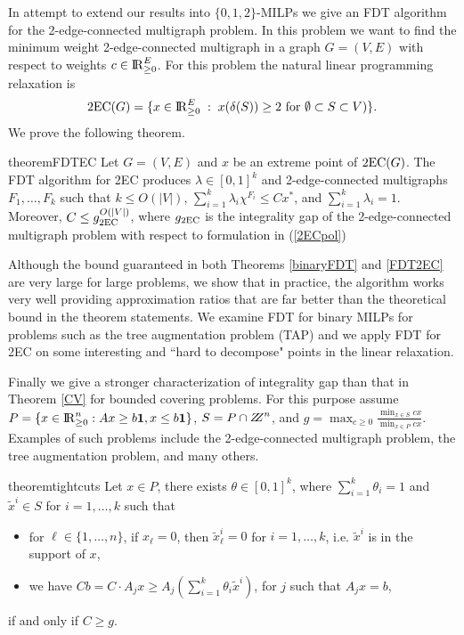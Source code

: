 \documentclass[runningheads]{llncs}
\begin{document}
In attempt to extend our results into $\{0,1,2\}$-MILPs we give an FDT algorithm for the 2-edge-connected multigraph problem. In this problem we want to find the minimum weight 2-edge-connected multigraph in a graph $G=(V,E)$ with respect to weights $c\in {\rm I\!R}^E_{\geq 0}$. For this problem the natural linear programming relaxation is
\begin{equation}\label{2ECpol}
\operatorname{2EC}(G)= \{x\in {\rm I\!R}_{\geq 0}^{E}\;:\; x(\delta(S))\geq 2 \text{ for $\emptyset \subset S\subset V$})\}.\end{equation}
We prove the following theorem.

\begin{restatable}{theorem}{FDTEC}
	\label{FDT2EC}
	Let $G=(V,E)$ and $x$ be an extreme point of  $\operatorname{2EC}(G)$. The FDT algorithm for 2EC produces $\lambda\in [0,1]^k$ and 2-edge-connected multigraphs $F_1,\ldots,F_k$ such that $k\leq O(|V|)$, $\sum_{i=1}^{k}\lambda_i \chi^{F_i}\leq Cx^*$, and $\sum_{i=1}^{k}\lambda_i = 1$. Moreover, $C\leq g_{\operatorname{2EC}}^{O(|V|)}$, where $g_{\operatorname{2EC}}$ is the integrality gap of the 2-edge-connected multigraph problem with respect to formulation in (\ref{2ECpol}) 
\end{restatable}

Although the bound guaranteed in both Theorems \ref{binaryFDT} and \ref{FDT2EC} are very large for large problems, we show that in practice, the algorithm works very well providing approximation ratios that are far better than the theoretical bound in the theorem statements. We examine FDT for binary MILPs for problems such as the tree augmentation problem (TAP) and we apply FDT for 2EC on some interesting and ``hard to decompose" points in the linear relaxation. 

Finally we give a stronger characterization of integrality gap than that in Theorem \ref{CV} for bounded covering problems. For this purpose assume $P= \{x\in {\rm I\!R}^n_{\geq 0}: Ax\geq b\textbf{1}, x \leq b\textbf{1}\}$, $S= P\cap \bbbz^n$, and $g= \max_{c\geq 0} \frac{\min_{x\in S}cx}{\min_{x\in P}cx}$. Examples of such problems include the 2-edge-connected multigraph problem, the tree augmentation problem, and many others.


\begin{restatable}{theorem}{tightcuts}
	\label{tightcuts}
	Let $x\in P$, there exists $\theta\in [0,1]^k$, where $\sum_{i=1}^{k}\theta_i = 1$ and $\tilde{x}^i \in S$ for $i=1,\ldots,k$ such that \begin{itemize}
		\item for $\ell\in \{1,\ldots,n\}$, if $x_\ell =0$, then $\tilde{x}^i_\ell=0$ for $i =1,\ldots,k$, i.e. $\tilde{x}^i$ is in the support of $x$,
		\item we have $Cb = C\cdot A_j x \geq A_j (\sum_{i=1}^{k}\theta_i\tilde{x}^i)$, for $j$ such that $A_j x =b$,  
	\end{itemize}
	if and only if $C\geq g$.
\end{restatable}
\end{document}
